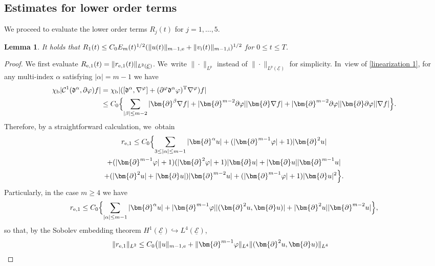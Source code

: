 \documentclass[10pt]{amsart}
\newcommand{\cE}{{\mathcal E}}
\newcommand{\ul}[1]{\underline{#1}}
\newtheorem{lemma}[theorem]{Lemma}
\theoremstyle{definition}
\begin{document}
\subsection{Estimates for lower order terms}\label{sectestLOT}
We proceed to evaluate the lower order terms $R_j(t)$ for $j=1,\ldots,5$.

\begin{lemma}\label{lem:EstR1}
It holds that $R_1(t) \leq C_0E_m(t)^{1/2}(\|u(t)\|_{m-1,{\rm e}}+\|v_\mathrm{i}(t)\|_{m-1,{\rm i}})^{1/2}$ for $0\leq t\leq T$.
\end{lemma}

\begin{proof}
We first evaluate $R_{{\rm e},1}(t)=\|r_{{\rm e},1}(t)\|_{L^2(\ul{\cE})}$. We~write $\|\cdot\|_{L^p}$ instead of $\|\cdot\|_{L^p(\ul{\cE})}$ for simplicity. In~view of \eqref{linearization 1}, for any multi-index $\alpha$ satisfying $|\alpha|=m-1$ we have
\begin{align*}
\chi_\mathrm{b}|{\mathcal C}^1(\mathfrak{d}^\alpha,\partial \varphi)f|
&= \chi_\mathrm{b}|([\mathfrak{d}^\alpha,\nabla^\varphi]+(\partial^\varphi\mathfrak{d}^\alpha\varphi)^{\rm T}\nabla^\varphi)f| \\
&\leq C_0 \Bigl\{ \sum_{|\beta|\leq m-2}|\bm{\partial}^\beta\nabla f| + |\bm{\partial}^{m-2}\partial\varphi||\bm{\partial}\nabla f|
+ |\bm{\partial}^{m-2}\partial\varphi||\bm{\partial}\partial\varphi||\nabla f| \Bigr\}.
\end{align*}
Therefore, by a straightforward calculation, we~obtain
\begin{multline*}
r_{{\rm e},1}
\leq C_0\Bigl\{ \sum_{3\leq|\alpha|\leq m-1}|\bm{\partial}^\alpha u| + (|\bm{\partial}^{m-1}\varphi|+1)|\bm{\partial}^2u| \\
+ (|\bm{\partial}^{m-1}\varphi|+1)(|\bm{\partial}^2\varphi|+1)|\bm{\partial}u| + |\bm{\partial}u||\bm{\partial}^{m-1}u| \\
+ (|\bm{\partial}^2u|+|\bm{\partial}u|)|\bm{\partial}^{m-2}u| + (|\bm{\partial}^{m-1}\varphi|+1)|\bm{\partial}u|^2 \Bigr\}.
\end{multline*}
Particularly, in the case $m\geq 4$ we have
\[
r_{{\rm e},1}
\leq C_0 \Bigl\{ \sum_{|\alpha|\leq m-1}|\bm{\partial}^\alpha u| + |\bm{\partial}^{m-1}\varphi||(\bm{\partial}^2u,\bm{\partial}u)|
+ |\bm{\partial}^2u||\bm{\partial}^{m-2}u| \Bigr\},
\]
so that, by the Sobolev embedding theorem $H^1(\ul{\cE}) \hookrightarrow L^4(\ul{\cE})$,
\begin{align*}
\|r_{{\rm e},1}\|_{L^2}
&\leq C_0 \bigl(\|u\|_{m-1,{\rm e}} + \|\bm{\partial}^{m-1}\varphi\|_{L^4}\|(\bm{\partial}^2u,\bm{\partial}u)\|_{L^4}

\end{align*}
\end{proof}
\end{document}
